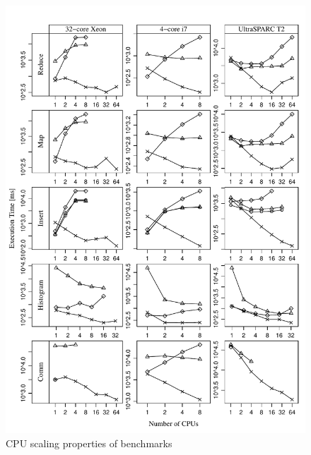 \documentclass[runningheads,a4paper]{llncs}
\begin{document}
\begin{figure}
\includegraphics[width=\textwidth]{../benchmarks/graphs/cpu-scaling}
\caption{CPU scaling properties of benchmarks}
\end{figure}
\end{document}
